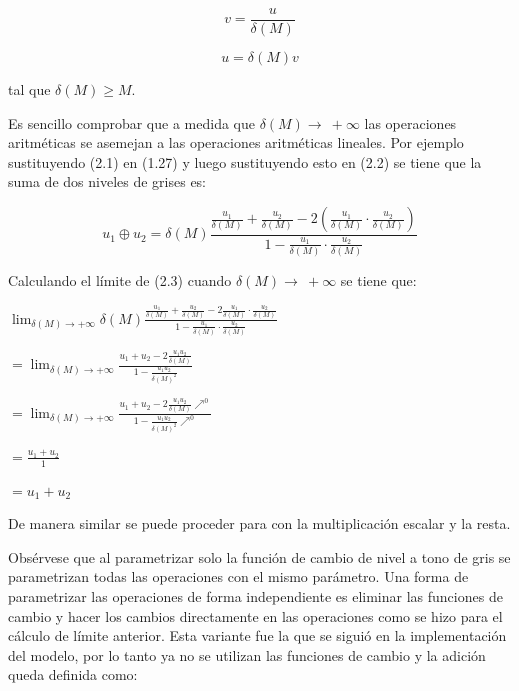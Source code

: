 \begin{equation}
	v=\frac{u}{\delta(M)}
\end{equation}

\begin{equation}
	u=\delta(M)v
\end{equation}

tal que $\delta(M) \geq M$.

Es sencillo comprobar que a medida que $\delta(M)\to\ +\infty$ las operaciones aritm\'eticas se asemejan a las operaciones aritm\'eticas lineales. Por ejemplo sustituyendo (2.1) en (1.27) y luego sustituyendo esto en (2.2) se tiene que la suma de dos niveles de grises es:

\begin{equation}
	u_1\oplus u_2=\delta(M)\frac{\frac{u_1}{\delta(M)}+\frac{u_2}{\delta(M)}-2\left(\frac{u_1}{\delta(M)}\cdot\frac{u_2}{\delta(M)}\right)}{1-\frac{u_1}{\delta(M)}\cdot\frac{u_2}{\delta(M)}}
\end{equation}

Calculando el l\'imite de (2.3) cuando $\delta(M)\to\ +\infty$ se tiene que:

\begin{center}
	$\displaystyle\lim_{\delta(M) \to +\infty}\delta(M)\frac{\frac{u_1}{\delta(M)}+\frac{u_2}{\delta(M)}-2\frac{u_1}{\delta(M)}\cdot\frac{u_2}{\delta(M)}}{1-\frac{u_1}{\delta(M)}\cdot\frac{u_2}{\delta(M)}}$
	
	$\displaystyle=\lim_{\delta(M) \to +\infty}\frac{u_1+u_2-2\frac{u_1u_2}{\delta(M)}}{1-\frac{u_1u_2}{\delta(M)^2}}$
	
	$\displaystyle=\lim_{\delta(M) \to +\infty}\frac{u_1+u_2-2\frac{u_1u_2}{\delta(M)}\nearrow^0}{1-\frac{u_1u_2}{\delta(M)^2}\nearrow^0}$
	
	$\displaystyle=\frac{u_1+u_2}{1}$
	
	$\displaystyle=u_1+u_2$
\end{center}

De manera similar se puede proceder para con la multiplicaci\'on escalar y la resta.

Obs\'ervese que al parametrizar solo la funci\'on de cambio de nivel a tono de gris se parametrizan todas las operaciones con el mismo par\'ametro. Una forma de parametrizar las operaciones de forma independiente es eliminar las funciones de cambio y hacer los cambios directamente en las operaciones como se hizo para el c\'alculo de l\'imite anterior. Esta variante fue la que se sigui\'o en la implementaci\'on del modelo, por lo tanto ya no se utilizan las funciones de cambio y la adici\'on queda definida como:

